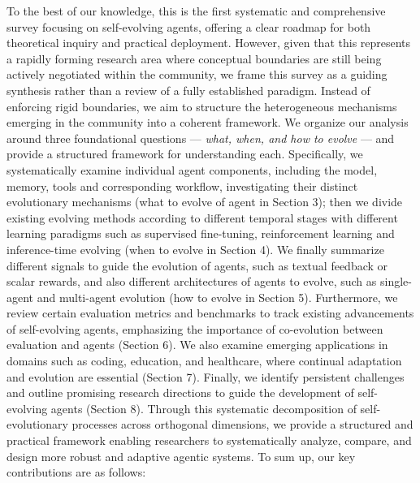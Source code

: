 \documentclass[10pt]{article} %
\begin{document}
To the best of our knowledge, this is the first systematic and comprehensive survey focusing on self-evolving agents, offering a clear roadmap for both theoretical inquiry and practical deployment. However, given that this represents a rapidly forming research area where conceptual boundaries are still being actively negotiated within the community, we frame this survey as a guiding synthesis rather than a review of a fully established paradigm. Instead of enforcing rigid boundaries, we aim to structure the heterogeneous mechanisms emerging in the community into a coherent framework.
We organize our analysis around three foundational questions --- \textit{what, when, and how to evolve} --- and provide a structured framework for understanding each. Specifically, we systematically examine individual agent components, including the model, memory, tools and corresponding workflow, investigating their distinct evolutionary mechanisms (what to evolve of agent in Section 3); then we divide existing evolving methods according to different temporal stages with different learning paradigms such as supervised fine-tuning, reinforcement learning and inference-time evolving (when to evolve in Section 4). We finally summarize different signals to guide the evolution of agents, such as textual feedback or scalar rewards, and also different architectures of agents to evolve, such as single-agent and multi-agent evolution 
(how to evolve in Section 5). Furthermore, we review certain evaluation metrics and benchmarks to track existing advancements of self-evolving agents, emphasizing the importance of co-evolution between evaluation and agents (Section 6). We also examine emerging applications in domains such as coding, education, and healthcare, where continual adaptation and evolution are essential (Section 7). Finally, we identify persistent challenges and outline promising research directions to guide the development of self-evolving agents (Section 8). Through this systematic decomposition of self-evolutionary processes across orthogonal dimensions, we provide a structured and practical framework enabling researchers to systematically analyze, compare, and design more robust and adaptive agentic systems. To sum up, our key contributions are as follows:
\end{document}
